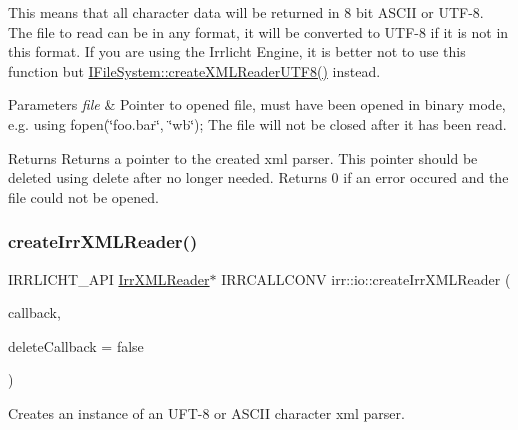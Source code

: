 This means that all character data will be returned in 8 bit A\+S\+C\+II or U\+T\+F-\/8. The file to read can be in any format, it will be converted to U\+T\+F-\/8 if it is not in this format. If you are using the Irrlicht Engine, it is better not to use this function but \hyperlink{classirr_1_1io_1_1IFileSystem_affd8f622ac7c3dcd507f20f9cd23b21f}{I\+File\+System\+::create\+X\+M\+L\+Reader\+U\+T\+F8()} instead. 
\begin{DoxyParams}{Parameters}
{\em file} & Pointer to opened file, must have been opened in binary mode, e.\+g. using fopen(\char`\"{}foo.\+bar\char`\"{}, \char`\"{}wb\char`\"{}); The file will not be closed after it has been read. \\
\hline
\end{DoxyParams}
\begin{DoxyReturn}{Returns}
Returns a pointer to the created xml parser. This pointer should be deleted using \textquotesingle{}delete\textquotesingle{} after no longer needed. Returns 0 if an error occured and the file could not be opened. 
\end{DoxyReturn}
\mbox{\label{namespaceirr_1_1io_af853ea962be4432c2d9a50cc7d303fe5}} 
\subsubsection{\texorpdfstring{create\+Irr\+X\+M\+L\+Reader()}{createIrrXMLReader()}\hspace{0.1cm}{\footnotesize\ttfamily [3/3]}}
{\footnotesize\ttfamily I\+R\+R\+L\+I\+C\+H\+T\+\_\+\+A\+PI \hyperlink{namespaceirr_1_1io_a1628edbb9d5d53f18c82d2a92b0ad27e}{Irr\+X\+M\+L\+Reader}$\ast$ I\+R\+R\+C\+A\+L\+L\+C\+O\+NV irr\+::io\+::create\+Irr\+X\+M\+L\+Reader (\begin{DoxyParamCaption}\item[{\hyperlink{classirr_1_1io_1_1IFileReadCallBack}{I\+File\+Read\+Call\+Back} $\ast$}]{callback,  }\item[{bool}]{delete\+Callback = {\ttfamily false} }\end{DoxyParamCaption})}



Creates an instance of an U\+F\+T-\/8 or A\+S\+C\+II character xml parser. 

